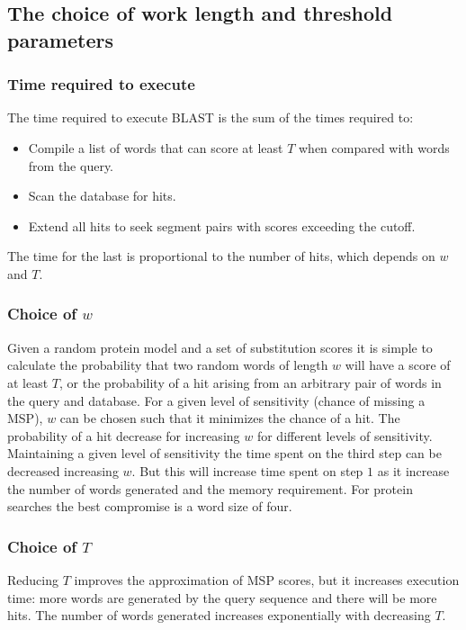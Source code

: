 	\subsection{The choice of work length and threshold parameters}

		\subsubsection{Time required to execute}
		The time required to execute BLAST is the sum of the times required to:

		\begin{multicols}{2}
			\begin{itemize}
				\item Compile a list of words that can score at least $T$ when compared with words from the query.
				\item Scan the database for hits.
				\item Extend all hits to seek segment pairs with scores exceeding the cutoff.
			\end{itemize}
		\end{multicols}

		The time for the last is proportional to the number of hits, which depends on $w$ and $T$.

		\subsubsection{Choice of $w$}
		Given a random protein model and a set of substitution scores it is simple to calculate the probability that two random words of length $w$ will have a score of at least $T$, or the probability of a hit arising from an arbitrary pair of words in the query and database.
		For a given level of sensitivity (chance of missing a MSP), $w$ can be chosen such that it minimizes the chance of a hit.
		The probability of a hit decrease for increasing $w$ for different levels of sensitivity.
		Maintaining a given level of sensitivity the time spent on the third step can be decreased increasing $w$.
		But this will increase time spent on step $1$ as it increase the number of words generated and the memory requirement.
		For protein searches the best compromise is a word size of four.

		\subsubsection{Choice of $T$}
		Reducing $T$ improves the approximation of MSP scores, but it increases execution time: more words are generated by the query sequence and there will be more hits.
		The number of words generated increases exponentially with decreasing $T$.

